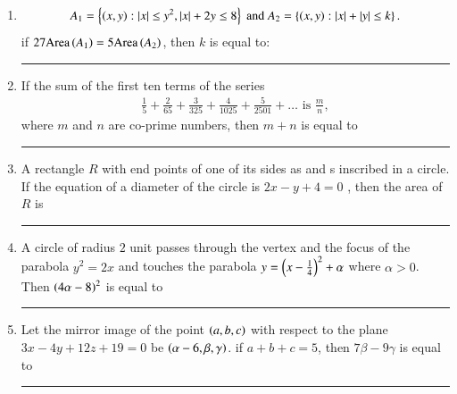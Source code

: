 \documentclass[journal]{IEEEtran}
\numberwithin{equation}{enumi}
\numberwithin{figure}{enumi}
\begin{document}
\begin{enumerate}
    \hfill{}

    \item 
    \begin{align*}
        A_1 = \left\{\left(x,y\right) : \left\vert x\right\vert \leq y^2, \left\vert x\right\vert + 2y \leq 8\right\} 
        \text{ and }
        A_2 = \left\{\left(x,y\right) : \left\vert x\right\vert + \left\vert y\right\vert \leq k\right\}.
    \end{align*}
    if $27\text{Area}\left(A_1\right) = 5\text{Area}\left(A_2\right)$, then $k$ is equal to: \rule{1cm}{0.1pt}

    \hfill{}

    \item 
    If the sum of the first ten terms of the series 
    \begin{align*}
        \frac{1}{5} + \frac{2}{65} + \frac{3}{325} + \frac{4}{1025} + \frac{5}{2501} + \dots \text{ is } \frac{m}{n},
    \end{align*}
    where $m$ and $n$ are co-prime numbers, then $m + n$ is equal to \rule{1cm}{0.1pt}

    \hfill{}

    \item 
    A rectangle $R$ with end points of one of its sides as  and  s inscribed in a circle. If the equation of a diameter of the circle is  $2x - y + 4 = 0$ , then the area of $R$ is \rule{1cm}{0.1pt}

    \hfill{}

    \item 
    A circle of radius $2$ unit passes through the vertex and the focus of the parabola $y^2 =  2x$ and touches the parabola $y = \left(x-\frac{1}{4}\right)^2 + \alpha$ where $\alpha > 0$. Then $\left(4\alpha - 8\right)^2$ is equal to \rule{1cm}{0.1pt}

    \hfill{}

    \item 
    Let the mirror image of the point $\left(a, b, c\right)$ with respect to the plane $ 3x - 4y + 12z + 19 = 0 $ be $\left(\alpha - 6, \beta, \gamma\right)$. if $a + b + c = 5$, then $7\beta - 9\gamma$ is equal to \rule{1cm}{0.1pt}
    
    \hfill{}
    
\end{enumerate}
\end{document}

